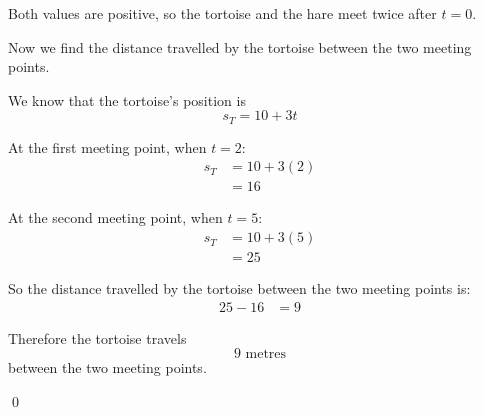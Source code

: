 \begin{solution}
Both values are positive, so the tortoise and the hare meet twice after $t=0$.

Now we find the distance travelled by the tortoise between the two meeting points.

We know that the tortoise's position is
\[
s_T = 10 + 3t
\]

At the first meeting point, when $t=2$:
\begin{align*}
    s_T &= 10 + 3(2) \\
        &= 16
\end{align*}

At the second meeting point, when $t=5$:
\begin{align*}
    s_T &= 10 + 3(5) \\
        &= 25
\end{align*}

So the distance travelled by the tortoise between the two meeting points is:
\begin{align*}
    25 - 16 &= 9
\end{align*}

Therefore the tortoise travels
\[
9 \text{ metres}
\]
between the two meeting points.

\qed
\end{solution}
